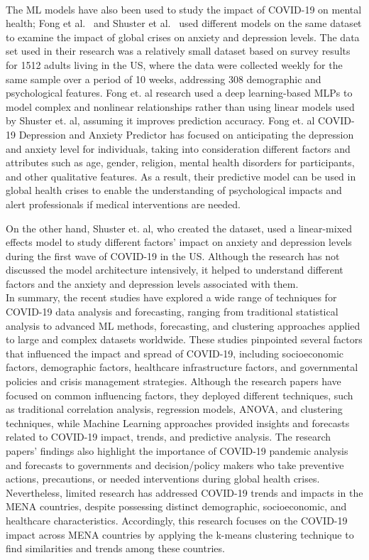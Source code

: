 \documentclass[a4paper]{report}
\begin{document}
\\

The ML models have also been used to study the impact of COVID-19 on mental health; Fong et al.~\cite{fong2024predicting} and Shuster et al.~\cite{shuster2021emotional} used different models on the same dataset to examine the impact of global crises on anxiety and depression levels. The data set used in their research was a relatively small dataset based on survey results for 1512 adults living in the US, where the data were collected weekly for the same sample over a period of 10 weeks, addressing 308 demographic and psychological features. Fong et. al research used a deep learning-based MLPs to model complex and nonlinear relationships rather than using linear models used by Shuster et. al, assuming it improves prediction accuracy. Fong et. al COVID-19 Depression and Anxiety Predictor has focused on anticipating the depression and anxiety level for individuals, taking into consideration different factors and attributes such as age, gender, religion, mental health disorders for participants, and other qualitative features. As a result, their predictive model can be used in global health crises to enable the understanding of psychological impacts and alert professionals if medical interventions are needed.

On the other hand, Shuster et. al, who created the dataset, used a linear-mixed effects model to study different factors' impact on anxiety and depression levels during the first wave of COVID-19 in the US. Although the research has not discussed the model architecture intensively, it helped to understand different factors and the anxiety and depression levels associated with them. 
\\

In summary, the recent studies have explored a wide range of techniques for COVID-19 data analysis and forecasting, ranging from traditional statistical analysis to advanced ML methods, forecasting, and clustering approaches applied to large and complex datasets worldwide. These studies pinpointed several factors that influenced the impact and spread of COVID-19, including socioeconomic factors, demographic factors, healthcare infrastructure factors,   and governmental policies and crisis management strategies. Although the research papers have focused on common influencing factors, they deployed different techniques, such as traditional correlation analysis, regression models, ANOVA, and clustering techniques, while Machine Learning approaches provided insights and forecasts related to COVID-19 impact, trends, and predictive analysis. The research papers' findings also highlight the importance of COVID-19 pandemic analysis and forecasts to governments and decision/policy makers who take preventive actions, precautions, or needed interventions during global health crises. 
\\
Nevertheless, limited research has addressed COVID-19 trends and impacts in the MENA countries, despite possessing distinct demographic, socioeconomic, and healthcare characteristics. Accordingly, this research focuses on the COVID-19 impact across MENA countries by applying the k-means clustering technique to find similarities and trends among these countries.
 
\end{document}
